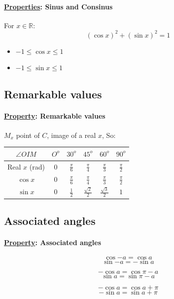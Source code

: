 \documentclass{article}
\begin{document}
\paragraph*{\underline{Properties}: Sinus and Consinus}
For $x \in \mathbb{R}$:
$$(\cos{x})^2 + (\sin{x})^2 = 1$$
\begin{itemize}
    \item $-1 \le \cos{x} \le 1$
    \item $-1 \le \sin{x} \le 1$
\end{itemize}
\subsection{Remarkable values}
\paragraph{\underline{Property}: Remarkable values}
$M_x$ point of $C$, image of a real $x$, So:
\linebreak
\begin{center}
    \begin{tabular}{ |c|c|c|c|c|c| } 
        \hline
        $\angle{OIM}$ & $O^o$ & $30^o$ & $45^o$ & $60^o$ & $90^o$ \\
        \hline
        Real $x$ (rad) & $0$ & \Large $\frac{\pi}{6}$ & \Large $\frac{\pi}{4}$ & \Large $\frac{\pi}{3}$ & \Large $\frac{\pi}{2}$ \\
        \hline
        $\cos{x}$ & $0$ & \Large $\frac{\pi}{6}$ & \Large $\frac{\pi}{4}$ & \Large $\frac{\pi}{3}$ & \Large $\frac{\pi}{2}$ \\
        \hline
        $\sin{x}$ & $0$ & \Large $\frac{1}{2}$ & \Large $\frac{\sqrt{2}}{2}$ & \Large $\frac{\sqrt{3}}{2}$ & \Large $1$ \\
        \hline
    \end{tabular}
\end{center}
\subsection{Associated angles}
\paragraph*{\underline{Property}: Associated angles}
$$\cos{-a} = \cos{a}$$
$$\sin{-a} = -\sin{a}$$

$$-\cos{a} = \cos{\pi - a}$$
$$\sin{a} = \sin{\pi - a}$$

$$-\cos{a} = \cos{a + \pi}$$
$$-\sin{a} = \sin{a + \pi}$$
\end{document}
